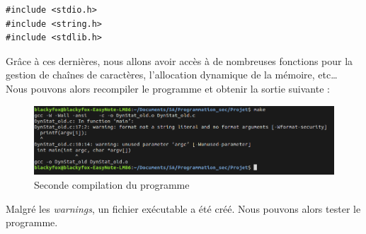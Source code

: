 \begin{lstlisting}
#include <stdio.h>
#include <string.h>
#include <stdlib.h>
\end{lstlisting}
Grâce à ces dernières, nous allons avoir accès à de nombreuses fonctions pour la gestion de chaînes de caractères, l'allocation dynamique de la mémoire, etc\ldots\\
Nous pouvons alors recompiler le programme et obtenir la sortie suivante :
\begin{figure}[H]
  \centering
  \includegraphics[width=.9\textwidth]{img/compile2.png}
  \caption{Seconde compilation du programme}
  \label{img:2}
\end{figure}
Malgré les \textit{warnings}, un fichier exécutable a été créé. Nous pouvons alors tester le programme.\\
